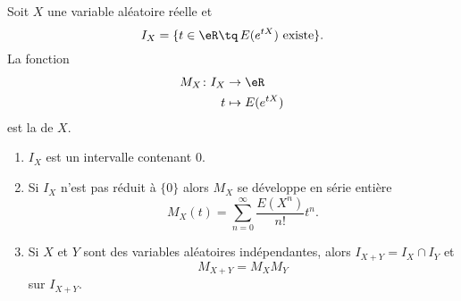\begin{theorem}
	Soit \( X\) une variable aléatoire réelle et
	\begin{equation}
		I_X=\{ t\in \eR\tq  \,E( e^{tX}) \text{ existe}\}.
	\end{equation}
	La fonction
	\begin{equation}
		\begin{aligned}
			M_X\colon I_X & \to \eR            \\
			t             & \mapsto E( e^{tX})
		\end{aligned}
	\end{equation}
	est la  de \( X\).
	\begin{enumerate}
		\item
		      \( I_X\) est un intervalle contenant \( 0\).
		\item
		      Si \( I_X\) n'est pas réduit à \( \{ 0 \}\) alors \( M_X\) se développe en série entière
		      \begin{equation}
			      M_X(t)=\sum_{n=0}^{\infty}\frac{ E(X^n) }{ n! }t^n.
		      \end{equation}
		\item
		      Si \( X\) et \( Y\) sont des variables aléatoires indépendantes, alors \( I_{X+Y}=I_X\cap I_Y\) et
		      \begin{equation}
			      M_{X+Y}=M_XM_Y
		      \end{equation}
		      sur \( I_{X+Y}\).
	\end{enumerate}
\end{theorem}

